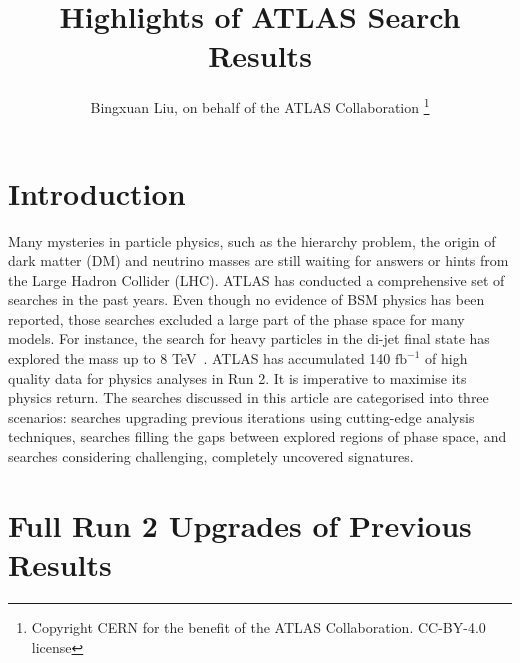 \documentclass{moriond}
\begin{document}
\title{Highlights of ATLAS Search Results}

\author{Bingxuan Liu, on behalf of the ATLAS Collaboration \footnote{Copyright CERN for the benefit of the ATLAS Collaboration. CC-BY-4.0 license}}

\address{Department of Physics, Simon Fraser University, Vancouver, Canada}

\maketitle{}  

\section{Introduction}

Many mysteries in particle physics, such as the hierarchy problem, the origin
of dark matter (DM) and neutrino masses are still waiting for answers or hints
from the Large Hadron Collider (LHC). ATLAS has conducted a comprehensive set
of searches in the past years. Even though no evidence of BSM physics has been
reported, those searches excluded a large part of the phase space for many
models. For instance, the search for heavy particles in the di-jet final state
has explored the mass up to 8 TeV~\cite{dijet}. ATLAS has accumulated 140
$\mathrm{fb}^{-1}$ of high quality data for physics analyses in Run 2. It is
imperative to maximise its physics return. The searches discussed in this
article are categorised into three scenarios: searches upgrading previous
iterations using cutting-edge analysis techniques, searches filling the gaps
between explored regions of phase space, and searches considering challenging,
completely uncovered signatures.      

\section{Full Run 2 Upgrades of Previous Results}
\end{document}
